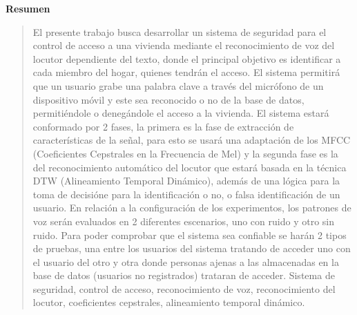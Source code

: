 %

%


\newpage
\begin{center}
 {\bf\LARGE Resumen}
\end{center} 
\begin{quotation}
El presente trabajo busca desarrollar un sistema de seguridad para el control de acceso a una vivienda mediante el reconocimiento de voz del locutor dependiente del texto, donde el principal objetivo es identificar a cada miembro del hogar, quienes tendrán el acceso. El sistema permitirá que un usuario grabe una palabra clave a través del micrófono de un dispositivo móvil y este sea reconocido o no de la base de datos, permitiéndole o denegándole el acceso a la vivienda. El sistema estará conformado por 2 fases, la primera es la fase de extracción de características de la señal, para esto se usará una adaptación de los MFCC (Coeficientes Cepstrales en la Frecuencia de Mel) y la segunda fase es la del reconocimiento automático del locutor que estará basada en la técnica DTW (Alineamiento Temporal Dinámico), además de una lógica para la toma de decisióne para la identificación o no, o falsa identificación de un usuario. En relación a la configuración de los experimentos, los patrones de voz serán evaluados en 2 diferentes escenarios, uno con ruido y otro sin ruido. Para poder comprobar que el sistema sea confiable se harán 2 tipos de pruebas, una entre los usuarios del sistema tratando de acceder uno con el usuario del otro y otra donde personas ajenas a las almacenadas en la base de datos (usuarios no registrados) trataran de acceder.
\vskip 0.25cm
\hspace*{-0.6cm}{\bf Palabras claves:} Sistema de seguridad, control de acceso, reconocimiento de voz, reconocimiento del locutor, coeficientes cepstrales, alineamiento temporal dinámico.
\end{quotation}



